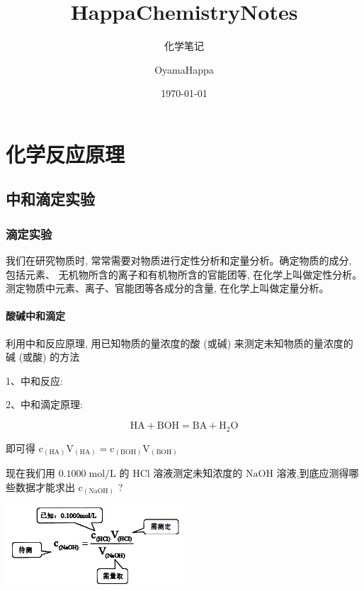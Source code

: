 \documentclass[10pt,cn]{elegantbook}
\title{HappaChemistryNotes}
\subtitle{化学笔记}
\author{OyamaHappa}
\date{\today}
\begin{document}
	
	\maketitle
	
	\tableofcontents
	
	\mainmatter

	\part{化学反应原理}
    \chapter{中和滴定实验}
	\section{滴定实验}
	
	我们在研究物质时, 常常需要对物质进行定性分析和定量分析。确定物质的成分, 包括元素、 无机物所含的离子和有机物所含的官能团等, 在化学上叫做定性分析。测定物质中元素、离子、官能团等各成分的含量, 在化学上叫做定量分析。
	
	
	\subsection{酸碱中和滴定}
	
	利用中和反应原理, 用已知物质的量浓度的酸 (或碱) 来测定未知物质的量浓度的碱 (或酸) 的方法
	
	1、中和反应:
	
	2、中和滴定原理:
	
	\[
	\mathrm{{HA}} + \mathrm{{BOH}} = \mathrm{{BA}} + {\mathrm{H}}_{2}\mathrm{O}
	\]
	
	
	即可得 \({\mathrm{c}}_{\left( \mathrm{{HA}}\right) }{\mathrm{V}}_{\left( \mathrm{{HA}}\right) } = {\mathrm{c}}_{\left( \mathrm{{BOH}}\right) }{\mathrm{V}}_{\left( \mathrm{{BOH}}\right) }\)
	
	现在我们用 \({0.1000}\mathrm{\;{mol}}/\mathrm{L}\) 的 \(\mathrm{{HCl}}\) 溶液测定未知浓度的 \(\mathrm{{NaOH}}\) 溶液,到底应测得哪些数据才能求出 \({\mathrm{c}}_{\left( \mathrm{{NaOH}}\right) }\) ?
	
	\begin{center}
		\includegraphics[max width=0.5\textwidth]{image/c1.jpg}
	\end{center}
	
\end{document}
